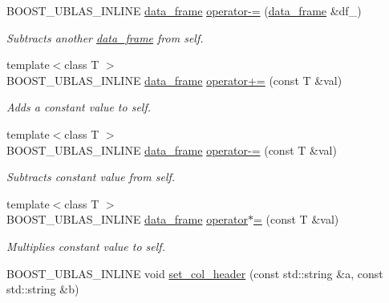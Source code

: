 \begin{DoxyCompactItemize}
B\+O\+O\+S\+T\+\_\+\+U\+B\+L\+A\+S\+\_\+\+I\+N\+L\+I\+NE \hyperlink{classboost_1_1numeric_1_1ublas_1_1data__frame}{data\+\_\+frame} \hyperlink{classboost_1_1numeric_1_1ublas_1_1data__frame_a897fe5b006544f9c3982c34050b7b07f}{operator-\/=} (\hyperlink{classboost_1_1numeric_1_1ublas_1_1data__frame}{data\+\_\+frame} \&df\+\_\+)
\begin{DoxyCompactList}\small\item\em Subtracts another \hyperlink{classboost_1_1numeric_1_1ublas_1_1data__frame}{data\+\_\+frame} from self. \end{DoxyCompactList}\item 
{\footnotesize template$<$class T $>$ }\\B\+O\+O\+S\+T\+\_\+\+U\+B\+L\+A\+S\+\_\+\+I\+N\+L\+I\+NE \hyperlink{classboost_1_1numeric_1_1ublas_1_1data__frame}{data\+\_\+frame} \hyperlink{classboost_1_1numeric_1_1ublas_1_1data__frame_a7c89a6fbd9cbf20d1efadb9f03e082cc}{operator+=} (const T \&val)
\begin{DoxyCompactList}\small\item\em Adds a constant value to self. \end{DoxyCompactList}\item 
{\footnotesize template$<$class T $>$ }\\B\+O\+O\+S\+T\+\_\+\+U\+B\+L\+A\+S\+\_\+\+I\+N\+L\+I\+NE \hyperlink{classboost_1_1numeric_1_1ublas_1_1data__frame}{data\+\_\+frame} \hyperlink{classboost_1_1numeric_1_1ublas_1_1data__frame_a397ffa26078912fffd633799e12d28e8}{operator-\/=} (const T \&val)
\begin{DoxyCompactList}\small\item\em Subtracts constant value from self. \end{DoxyCompactList}\item 
{\footnotesize template$<$class T $>$ }\\B\+O\+O\+S\+T\+\_\+\+U\+B\+L\+A\+S\+\_\+\+I\+N\+L\+I\+NE \hyperlink{classboost_1_1numeric_1_1ublas_1_1data__frame}{data\+\_\+frame} \hyperlink{classboost_1_1numeric_1_1ublas_1_1data__frame_ac0096de1abd69acd5866ce531cf6658a}{operator$\ast$=} (const T \&val)
\begin{DoxyCompactList}\small\item\em Multiplies constant value to self. \end{DoxyCompactList}\item 
B\+O\+O\+S\+T\+\_\+\+U\+B\+L\+A\+S\+\_\+\+I\+N\+L\+I\+NE void \hyperlink{classboost_1_1numeric_1_1ublas_1_1data__frame_a2fb1e0fda10bfd69c1b063b77440f56e}{set\+\_\+col\+\_\+header} (const std\+::string \&a, const std\+::string \&b)

\end{DoxyCompactItemize}
